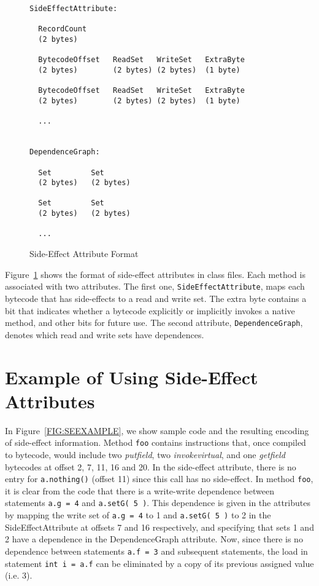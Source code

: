 \documentclass{article}
\begin{document}
\begin{figure}[htbp]
\centering
\begin{minipage}{130mm}
\begin{verbatim}
SideEffectAttribute:

  RecordCount   
  (2 bytes)     
  
  BytecodeOffset   ReadSet   WriteSet   ExtraByte
  (2 bytes)        (2 bytes) (2 bytes)  (1 byte)

  BytecodeOffset   ReadSet   WriteSet   ExtraByte
  (2 bytes)        (2 bytes) (2 bytes)  (1 byte)

  ...


DependenceGraph:

  Set         Set
  (2 bytes)   (2 bytes)

  Set         Set
  (2 bytes)   (2 bytes)

  ...

\end{verbatim}
\end{minipage}
\caption{Side-Effect Attribute Format\label{FIG:SEFORMAT}}
\end{figure}

Figure~\ref{FIG:SEFORMAT} shows the format of side-effect attributes in
class files. Each method is associated with two attributes. The
first one, {\tt SideEffectAttribute}, maps each bytecode that has
side-effects to a read and write set. The extra byte contains a bit
that indicates whether a bytecode explicitly or implicitly invokes a
native method, and other bits for future use. The second attribute, 
{\tt DependenceGraph}, denotes which read and write sets have dependences. 

\section{Example of Using Side-Effect Attributes}

In Figure~\ref{FIG:SEEXAMPLE}, we show sample code and the resulting
encoding of side-effect information. Method {\tt foo} contains
instructions that, once compiled to bytecode, would include two 
{\it putfield}, two {\it invokevirtual}, and one {\it getfield} 
bytecodes at offset 2, 7, 11, 16 and 20. 
In the side-effect attribute, there is no entry for {\tt a.nothing()}
(offset 11) since this call has no side-effect. 
In method {\tt foo}, it is clear from the code that
there is a write-write dependence between statements {\tt a.g = 4} and
{\tt a.setG( 5 )}. This dependence is given in the attributes by
mapping the write set of {\tt a.g = 4} to 1 and {\tt a.setG( 5 )} to 2
in the SideEffectAttribute at offsets
7 and 16 respectively, and specifying that sets 1 and 2 have a
dependence in the DependenceGraph attribute.
Now, since there is no dependence between statements {\tt a.f = 3} and
subsequent statements, the load in statement {\tt int i = a.f} can be
eliminated by a copy of its previous assigned value (i.e. 3).
\end{document}
